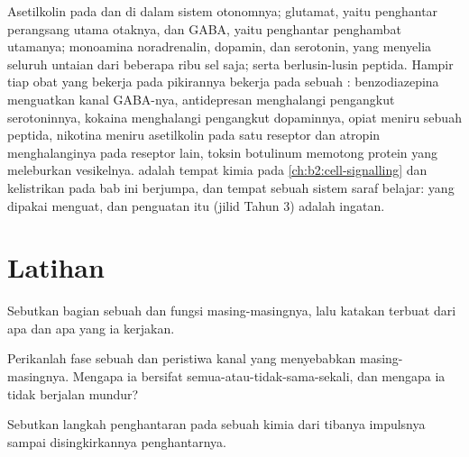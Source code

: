 \begin{example}\label{ex:b2:neurons-synapses:transmitters}
Asetilkolin pada  dan di dalam sistem otonomnya;
glutamat, yaitu penghantar perangsang utama otaknya, dan GABA, yaitu
penghantar penghambat utamanya; monoamina noradrenalin, dopamin, dan
serotonin, yang menyelia seluruh untaian dari beberapa ribu sel saja;
serta berlusin-lusin peptida. Hampir tiap obat yang bekerja pada
pikirannya bekerja pada sebuah : benzodiazepina menguatkan
kanal GABA-nya, antidepresan menghalangi pengangkut serotoninnya,
kokaina menghalangi pengangkut dopaminnya, opiat meniru sebuah peptida,
nikotina meniru asetilkolin pada satu reseptor dan atropin
menghalanginya pada reseptor lain, toksin botulinum memotong protein
yang meleburkan vesikelnya.  adalah tempat kimia pada
\cref{ch:b2:cell-signalling} dan kelistrikan pada bab ini berjumpa, dan
tempat sebuah sistem saraf belajar:  yang dipakai menguat, dan
penguatan itu (jilid Tahun 3) adalah ingatan.
\end{example}

\section{Latihan}

\begin{exercise}[$\star$]\label{exo:b2:neurons-synapses:1}
Sebutkan bagian sebuah  dan fungsi masing-masingnya, lalu
katakan  terbuat dari apa dan apa yang ia kerjakan.
\end{exercise}

\begin{exercise}[$\star$]\label{exo:b2:neurons-synapses:2}
Perikanlah fase sebuah  dan peristiwa kanal yang
menyebabkan masing-masingnya. Mengapa ia bersifat
semua-atau-tidak-sama-sekali, dan mengapa ia tidak berjalan mundur?
\end{exercise}

\begin{exercise}[$\star$]\label{exo:b2:neurons-synapses:3}
Sebutkan langkah penghantaran pada sebuah  kimia dari tibanya
impulsnya sampai disingkirkannya penghantarnya.
\end{exercise}

